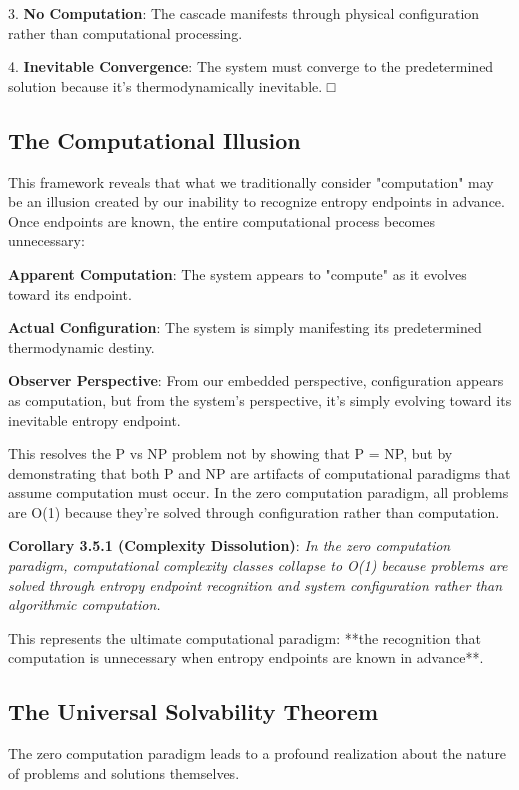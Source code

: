 \documentclass[12pt,a4paper]{article}
\theoremstyle{definition}
\begin{document}
3. \textbf{No Computation}: The cascade manifests through physical configuration rather than computational processing.

4. \textbf{Inevitable Convergence}: The system must converge to the predetermined solution because it's thermodynamically inevitable. □

\subsection{The Computational Illusion}

This framework reveals that what we traditionally consider "computation" may be an illusion created by our inability to recognize entropy endpoints in advance. Once endpoints are known, the entire computational process becomes unnecessary:

\textbf{Apparent Computation}: The system appears to "compute" as it evolves toward its endpoint.

\textbf{Actual Configuration}: The system is simply manifesting its predetermined thermodynamic destiny.

\textbf{Observer Perspective}: From our embedded perspective, configuration appears as computation, but from the system's perspective, it's simply evolving toward its inevitable entropy endpoint.

This resolves the P vs NP problem not by showing that P = NP, but by demonstrating that both P and NP are artifacts of computational paradigms that assume computation must occur. In the zero computation paradigm, all problems are O(1) because they're solved through configuration rather than computation.

\textbf{Corollary 3.5.1 (Complexity Dissolution)}: \textit{In the zero computation paradigm, computational complexity classes collapse to O(1) because problems are solved through entropy endpoint recognition and system configuration rather than algorithmic computation.}

This represents the ultimate computational paradigm: **the recognition that computation is unnecessary when entropy endpoints are known in advance**.

\subsection{The Universal Solvability Theorem}

The zero computation paradigm leads to a profound realization about the nature of problems and solutions themselves.
\end{document}
